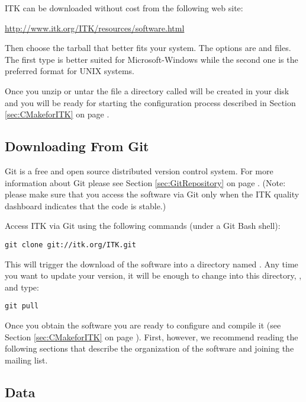ITK can be downloaded without cost from the following web site:
\begin{center}
  \url{http://www.itk.org/ITK/resources/software.html}
\end{center}

Then choose the tarball that better fits your system. The options are
 and  files.  The first type is better suited for
Microsoft-Windows while the second one is the preferred format for UNIX
systems.

Once you unzip or untar the file a directory called
 will be created in your disk and
you will be ready for starting the configuration process described in Section
\ref{sec:CMakeforITK} on page \pageref{sec:CMakeforITK}.

\subsection{Downloading From Git}
\label{sec:DownloadingFromGit}


Git is a free and open source distributed version control system.  For more
information about Git please see Section \ref{sec:GitRepository} on page
\pageref{sec:GitRepository}. (Note: please make sure that you access the
software via Git only when the ITK quality dashboard indicates that the code
is stable.)

Access ITK via Git using the following commands (under a Git Bash shell):
\begin{verbatim}
git clone git://itk.org/ITK.git
\end{verbatim}

This will trigger the download of the software into a directory named
.  Any time you want to update your version, it will be enough to
change into this directory, , and type:
\begin{verbatim}
git pull
\end{verbatim}

Once you obtain the software you are ready to configure and compile it (see
Section \ref{sec:CMakeforITK} on page \pageref{sec:CMakeforITK}). First,
however, we recommend reading the following sections that describe the
organization of the software and joining the mailing list.

\subsection{Data}
\label{sec:Data}

